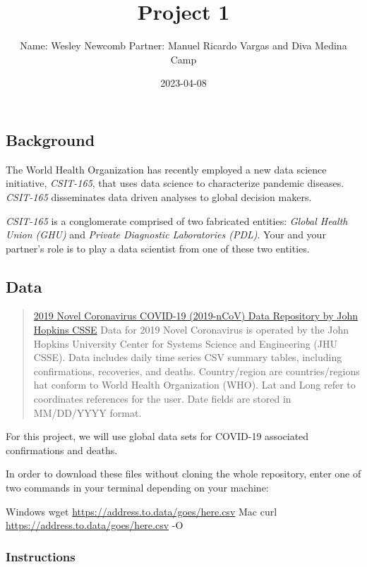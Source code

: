 \documentclass[
]{article}
\title{Project 1}
\author{Name: Wesley Newcomb Partner: Manuel Ricardo Vargas and Diva
Medina Camp}
\date{2023-04-08}
\begin{document}
\maketitle

\hypertarget{background}{%
\subsection{Background}\label{background}}

The World Health Organization has recently employed a new data science
initiative, \emph{CSIT-165}, that uses data science to characterize
pandemic diseases. \emph{CSIT-165} disseminates data driven analyses to
global decision makers.

\emph{CSIT-165} is a conglomerate comprised of two fabricated entities:
\emph{Global Health Union (GHU)} and \emph{Private Diagnostic
Laboratories (PDL)}. Your and your partner's role is to play a data
scientist from one of these two entities.

\hypertarget{data}{%
\subsection{Data}\label{data}}

\begin{quote}
\href{https://github.com/CSSEGISandData/COVID-19/tree/master/csse_covid_19_data/csse_covid_19_time_series}{2019
Novel Coronavirus COVID-19 (2019-nCoV) Data Repository by John Hopkins
CSSE} Data for 2019 Novel Coronavirus is operated by the John Hopkins
University Center for Systems Science and Engineering (JHU CSSE). Data
includes daily time series CSV summary tables, including confirmations,
recoveries, and deaths. Country/region are countries/regions hat conform
to World Health Organization (WHO). Lat and Long refer to coordinates
references for the user. Date fields are stored in MM/DD/YYYY format.
\end{quote}

For this project, we will use global data sets for COVID-19 associated
confirmations and deaths.

In order to download these files without cloning the whole repository,
enter one of two commands in your terminal depending on your machine:

Windows wget \url{https://address.to.data/goes/here.csv} Mac curl
\url{https://address.to.data/goes/here.csv} -O

\hypertarget{instructions}{%
\subsubsection{Instructions}\label{instructions}}
\end{document}
